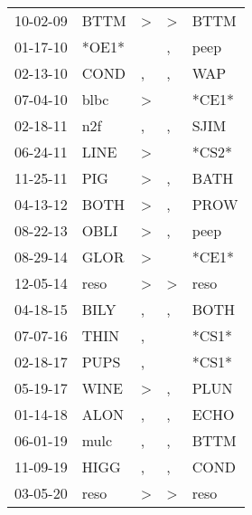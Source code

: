\begin{supertabular}{lllll}
 10-02-09 &   BTTM &  \textgreater &  \textgreater &   BTTM \\
 01-17-10 &  *OE1* &               &             , &   peep \\
 02-13-10 &   COND &             , &             , &    WAP \\
 07-04-10 &   blbc &  \textgreater &               &  *CE1* \\
 02-18-11 &    n2f &             , &             , &   SJIM \\
 06-24-11 &   LINE &  \textgreater &               &  *CS2* \\
 11-25-11 &    PIG &  \textgreater &             , &   BATH \\
 04-13-12 &   BOTH &  \textgreater &             , &   PROW \\
 08-22-13 &   OBLI &  \textgreater &             , &   peep \\
 08-29-14 &   GLOR &  \textgreater &               &  *CE1* \\
 12-05-14 &   reso &  \textgreater &  \textgreater &   reso \\
 04-18-15 &   BILY &             , &             , &   BOTH \\
 07-07-16 &   THIN &             , &               &  *CS1* \\
 02-18-17 &   PUPS &             , &               &  *CS1* \\
 05-19-17 &   WINE &  \textgreater &             , &   PLUN \\
 01-14-18 &   ALON &             , &             , &   ECHO \\
 06-01-19 &   mulc &             , &             , &   BTTM \\
 11-09-19 &   HIGG &             , &             , &   COND \\
 03-05-20 &   reso &  \textgreater &  \textgreater &   reso \\
\end{supertabular}
